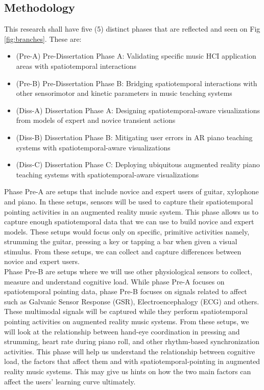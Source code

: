 \documentclass[manuscript,screen]{acmart}
\begin{document}
\subsection{Methodology}
This research shall have five (5) distinct phases that are reflected and seen on Fig \ref{fig:branches}. These are:
\begin{itemize}
    \item (Pre-A) Pre-Dissertation Phase A: Validating specific music HCI application areas with spatiotemporal interactions
    \item (Pre-B) Pre-Dissertation Phase B: Bridging spatiotemporal interactions with other sensorimotor and kinetic parameters in music teaching systems
    \item (Diss-A) Dissertation Phase A: Designing spatiotemporal-aware visualizations from models of expert and novice transient actions
    \item (Diss-B) Dissertation Phase B: Mitigating user errors in AR piano teaching systems with spatiotemporal-aware visualizations
    \item (Diss-C) Dissertation Phase C: Deploying ubiquitous augmented reality piano teaching systems with spatiotemporal-aware visualizations\\
\end{itemize}

Phase Pre-A are setups that include novice and expert users of guitar, xylophone and piano.  In these setups, sensors will be used to capture their spatiotemporal pointing activities in an augmented reality music system. This phase allows us to capture enough spatiotemporal data that we can use to build novice and expert models. These setups would focus only on specific, primitive activities namely, strumming the guitar, pressing a key or tapping a bar when given a visual stimulus. From these setups, we can collect and capture differences between novice and expert users. \\

Phase Pre-B are setups where we will use other physiological sensors to collect, measure and understand cognitive load. While phase Pre-A focuses on spatiotemporal pointing data, phase Pre-B focuses on signals related to affect such as Galvanic Sensor Response (GSR), Electroencephalogy (ECG) and others. These multimodal signals will be captured while they perform spatiotemporal pointing activities on augmented reality music systems. From these setups, we will look at the relationship between hand-eye coordination in pressing and strumming, heart rate during piano roll, and other rhythm-based synchronization activities. This phase will help us understand the relationship between cognitive load, the factors that affect them and with spatiotemporal-pointing in augmented reality music systems. This may give us hints on how the two main factors can affect the users’ learning curve ultimately.\\
\end{document}
